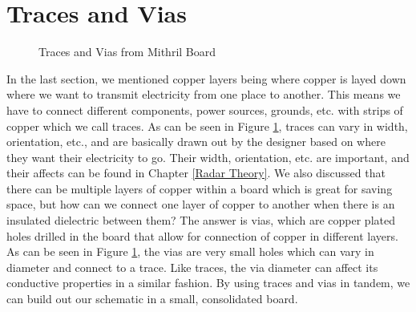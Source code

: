 \section{Traces and Vias}
\begin{figure}[H]
  \centering
\caption{Traces and Vias from Mithril Board}
\label{img:tracesandvias}
\end{figure}

In the last section, we mentioned copper layers being where copper is layed down where we want to transmit electricity from one place
to another. This means we have to connect different components, power sources, grounds, etc. with strips of copper which we call traces. As 
can be seen in Figure \ref{img:tracesandvias}, traces can vary in width, orientation, etc., and are basically drawn out by the designer based
on where they want their electricity to go. Their width, orientation, etc. are important, and their affects can be found in Chapter \ref{Radar Theory}.
We also discussed that there can be multiple layers of copper within a board which is great for saving space, but how can we connect one layer
of copper to another when there is an insulated dielectric between them? The answer is vias, which are copper plated holes drilled in the board
that allow for connection of copper in different layers. As can be seen in Figure \ref{img:tracesandvias}, the vias are very small holes which
can vary in diameter and connect to a trace. Like traces, the via diameter can affect its conductive properties in a similar fashion. By using
traces and vias in tandem, we can build out our schematic in a small, consolidated board.

